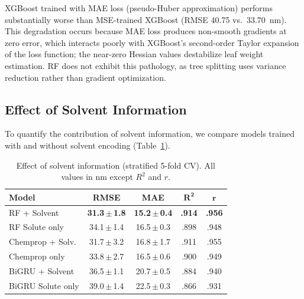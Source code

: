 XGBoost trained with MAE loss (pseudo-Huber approximation) performs substantially worse than MSE-trained XGBoost (RMSE 40.75 vs.\ 33.70~nm).
This degradation occurs because MAE loss produces non-smooth gradients at zero error, which interacts poorly with XGBoost's second-order Taylor expansion of the loss function\cite{chen2016xgboost}; the near-zero Hessian values destabilize leaf weight estimation.
RF does not exhibit this pathology, as tree splitting uses variance reduction rather than gradient optimization.


\subsection{Effect of Solvent Information}
\label{sec:solvent_ablation}

To quantify the contribution of solvent information, we compare models trained with and without solvent encoding (Table~\ref{tab:solvent_ablation}).

\begin{table}[htbp]
\centering
\caption{Effect of solvent information (stratified 5-fold CV). All values in nm except $R^2$ and $r$.}
\label{tab:solvent_ablation}
\footnotesize
\setlength{\tabcolsep}{3pt}
\begin{tabular}{@{}lcccc@{}}
\toprule
\textbf{Model} & \textbf{RMSE} & \textbf{MAE} & $\boldsymbol{R^2}$ & $\boldsymbol{r}$ \\
\midrule
RF + Solvent       & \textbf{31.3\,{\scriptsize$\pm$\,1.8}} & \textbf{15.2\,{\scriptsize$\pm$\,0.4}} & \textbf{.914} & \textbf{.956} \\
RF Solute only     & 34.1\,{\scriptsize$\pm$\,1.4}          & 16.5\,{\scriptsize$\pm$\,0.3}          & .898          & .948 \\
\midrule
Chemprop + Solv.   & 31.7\,{\scriptsize$\pm$\,3.2}          & 16.8\,{\scriptsize$\pm$\,1.7}          & .911          & .955 \\
Chemprop only      & 33.8\,{\scriptsize$\pm$\,2.7}          & 16.5\,{\scriptsize$\pm$\,0.6}          & .900          & .949 \\
\midrule
BiGRU + Solvent    & 36.5\,{\scriptsize$\pm$\,1.1}          & 20.7\,{\scriptsize$\pm$\,0.5}          & .884          & .940 \\
BiGRU Solute only  & 39.0\,{\scriptsize$\pm$\,1.4}          & 22.5\,{\scriptsize$\pm$\,0.3}          & .866          & .931 \\
\bottomrule
\end{tabular}
\end{table}

